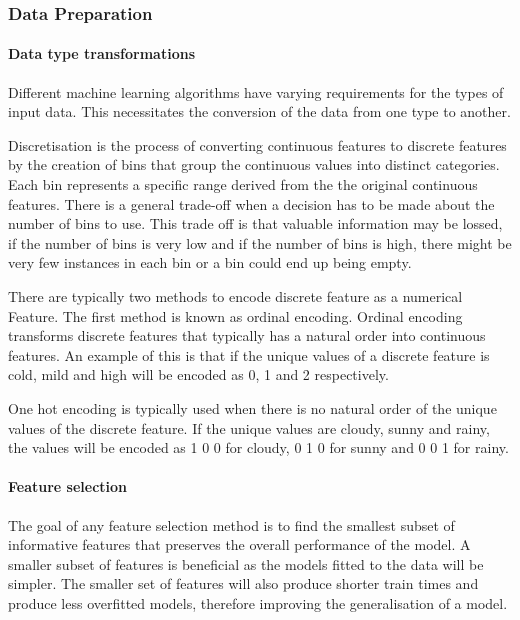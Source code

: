\documentclass[10pt, conference]{IEEEtran}
\begin{document}
\subsubsection{Data Preparation}

\paragraph{Data type transformations}

Different machine learning algorithms have varying requirements for the types of input data. This necessitates
the conversion of the data from one type to another.

Discretisation is the process of converting continuous features to discrete features by the creation of bins
that group the continuous values into distinct categories. Each bin represents a specific range derived from the
the original continuous features. There is a general trade-off when a decision has to be made about the number of
bins to use. This trade off is that valuable information may be lossed, if the number of bins is very low and
if the number of bins is high, there might be very few instances in each bin or a bin could end up being empty.

There are typically two methods to encode discrete feature as a numerical Feature. The first method is known as
ordinal encoding. Ordinal encoding transforms discrete features that typically has a natural order into continuous
features. An example of this is that if the unique values of a discrete feature is cold, mild and high will be
encoded as 0, 1 and 2 respectively.

One hot encoding is typically used when there is no natural order of the unique values of the discrete feature.
If the unique values are cloudy, sunny and rainy, the values will be encoded as 1 0 0 for cloudy, 0 1 0 for
sunny and 0 0 1 for rainy.


\paragraph{Feature selection} \label{feature_selection background}

The goal of any feature selection method is to find the smallest subset of informative features that
preserves the overall performance of the model. A smaller subset of features is beneficial as the
models fitted to the data will be simpler. The smaller set of features will also produce shorter
train times and produce less overfitted models, therefore improving the generalisation of a model.
\end{document}
